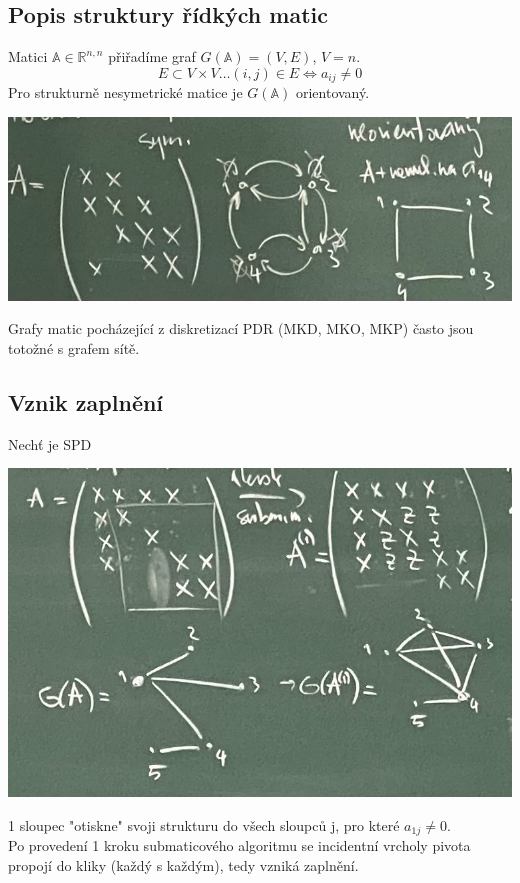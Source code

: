 \documentclass[../main.tex]{subfiles}
\begin{document}
\subsection{Popis struktury řídkých matic}
Matici $\mathbb{A}\in\mathbb{R}^{n,n}$ přiřadíme graf $G(\mathbb{A}) = (V,E)$, $V=\hat{n}$.\\
\begin{equation*}
    E\subset V\times V \dots (i,j)\in E \Leftrightarrow a_{ij} \neq 0 
\end{equation*}
Pro strukturně nesymetrické matice je $G(\mathbb{A})$ orientovaný.

\begin{center}
    \includegraphics[width=0.5\linewidth]{images/12-10-definice-pridruzeneho-grafu.jpg}
\end{center}

\begin{remark}
    Grafy matic pocházející z diskretizací PDR (MKD, MKO, MKP) často jsou totožné s grafem sítě. 
\end{remark}


\subsection{Vznik zaplnění}
Nechť \matA je SPD
\begin{center}
    \includegraphics[width=0.5\linewidth]{images/12-10-matice-s-pridruzenym-grafem.jpg}
\end{center}

1 sloupec "otiskne" svoji strukturu do všech sloupců j, pro které $a_{1j}\neq0$.\\
Po provedení 1 kroku submaticového algoritmu se incidentní vrcholy pivota propojí do kliky (každý s každým), tedy vzniká zaplnění.
\end{document}
